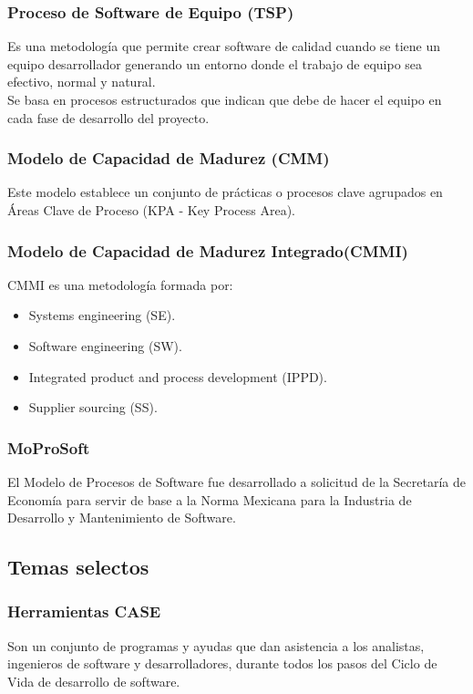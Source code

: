 \documentclass[12pt,twoside]{article}
\begin{document}
\subsubsection{Proceso de Software de Equipo (TSP)}
Es una metodología que permite crear software de calidad cuando se tiene un equipo 
desarrollador generando un entorno donde el trabajo de equipo sea efectivo, normal y 
natural.\\
Se basa en procesos estructurados que indican que debe de hacer el equipo en cada 
fase de desarrollo del proyecto.\\
\subsubsection{Modelo de Capacidad de Madurez (CMM)}
Este modelo establece un conjunto de prácticas o procesos clave agrupados en Áreas 
Clave de Proceso (KPA - Key Process Area).\\
\subsubsection{Modelo de Capacidad de Madurez Integrado(CMMI)}
CMMI es una metodología formada por:
\begin{itemize}
    \item Systems engineering (SE).
    \item Software engineering (SW).
    \item Integrated product and process development (IPPD).
    \item Supplier sourcing (SS).
\end{itemize}
\subsubsection{MoProSoft}
El Modelo de Procesos de Software fue desarrollado a solicitud de la Secretaría de 
Economía para servir de base a la Norma Mexicana para la Industria de Desarrollo y 
Mantenimiento de Software.

\subsection{Temas selectos}
\subsubsection{Herramientas CASE}
Son un conjunto de programas y ayudas que dan asistencia a los analistas, ingenieros 
de software y desarrolladores, durante todos los pasos del Ciclo de Vida de desarrollo 
de software.\\
\end{document}
